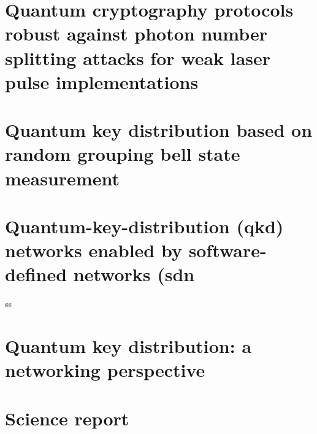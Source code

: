 \section{Quantum cryptography protocols robust against photon number splitting attacks for weak laser pulse implementations}


\section{Quantum key distribution based on random grouping bell state measurement}



\section{Quantum-key-distribution (qkd) networks enabled by software-defined networks (sdn}
ss

\section{Quantum key distribution: a networking perspective}


\section{Science report}
\blindtext
\clearpage


